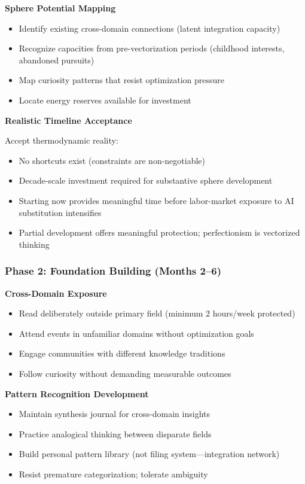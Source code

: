 \textbf{Sphere Potential Mapping}
\begin{itemize}
\item Identify existing cross-domain connections (latent integration capacity)
\item Recognize capacities from pre-vectorization periods (childhood interests, abandoned pursuits)
\item Map curiosity patterns that resist optimization pressure
\item Locate energy reserves available for investment
\end{itemize}

\textbf{Realistic Timeline Acceptance}

Accept thermodynamic reality:
\begin{itemize}
\item No shortcuts exist (constraints are non-negotiable)
\item Decade-scale investment required for substantive sphere development
\item Starting now provides meaningful time before labor-market exposure to AI substitution intensifies
\item Partial development offers meaningful protection; perfectionism is vectorized thinking
\end{itemize}

\subsubsection{Phase 2: Foundation Building (Months 2--6)}

\textbf{Cross-Domain Exposure}
\begin{itemize}
\item Read deliberately outside primary field (minimum 2 hours/week protected)
\item Attend events in unfamiliar domains without optimization goals
\item Engage communities with different knowledge traditions
\item Follow curiosity without demanding measurable outcomes
\end{itemize}

\textbf{Pattern Recognition Development}
\begin{itemize}
\item Maintain synthesis journal for cross-domain insights
\item Practice analogical thinking between disparate fields
\item Build personal pattern library (not filing system---integration network)
\item Resist premature categorization; tolerate ambiguity
\end{itemize}

